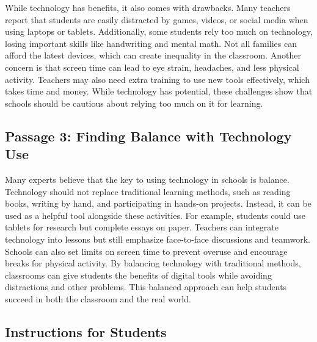 \documentclass[12pt]{article}
\begin{document}
While technology has benefits, it also comes with drawbacks. Many teachers report that students are easily distracted by games, videos, or social media when using laptops or tablets. Additionally, some students rely too much on technology, losing important skills like handwriting and mental math. Not all families can afford the latest devices, which can create inequality in the classroom. Another concern is that screen time can lead to eye strain, headaches, and less physical activity. Teachers may also need extra training to use new tools effectively, which takes time and money. While technology has potential, these challenges show that schools should be cautious about relying too much on it for learning.

\subsection*{Passage 3: Finding Balance with Technology Use}

Many experts believe that the key to using technology in schools is balance. \\Technology should not replace traditional learning methods, such as reading books, writing by hand, and participating in hands-on projects. Instead, it can be used as a helpful tool alongside these activities. For example, students could use tablets for research but complete essays on paper. Teachers can integrate technology into lessons but still emphasize face-to-face discussions and teamwork. Schools can also set limits on screen time to prevent overuse and encourage breaks for physical activity. By balancing technology with traditional methods, classrooms can give students the benefits of digital tools while avoiding distractions and other problems. This balanced approach can help students succeed in both the classroom and the real world.

\subsection*{Instructions for Students}
\end{document}
